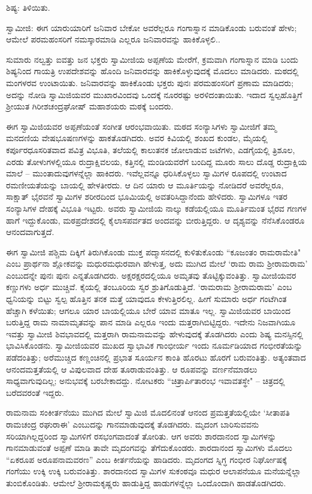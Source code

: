 ಶಿಷ್ಯ: ತಿಳಿಯಿತು.

ಸ್ವಾಮೀಜಿ: ಈಗ ಯಾರುಯಾರಿಗೆ ಜನಿವಾರ ಬೇಕೋ ಅವರೆಲ್ಲರೂ ಗಂಗಾಸ್ನಾನ ಮಾಡಿಕೊಂಡು ಬರುವಂತೆ ಹೇಳು; ಆಮೇಲೆ ಪರಮಹಂಸರಿಗೆ ನಮಸ್ಕಾರಮಾಡಿ ಎಲ್ಲರೂ ಜನಿವಾರವನ್ನು ಹಾಕಿಕೊಳ್ಳಲಿ..

ಸುಮಾರು ನಲ್ವತ್ತು ಐವತ್ತು ಜನ ಭಕ್ತರು ಸ್ವಾಮೀಜಿಯ ಅಪ್ಪಣೆಯ ಮೇರೆಗೆ, ಕ್ರಮವಾಗಿ ಗಂಗಾಸ್ನಾನ ಮಾಡಿ ಬಂದು ಶಿಷ್ಯನಿಂದ ಗಾಯತ್ರಿ ಉಪದೇಶವನ್ನು ಹೊಂದಿ ಜನಿವಾರವನ್ನು ಹಾಕಿಕೊಳ್ಳುವುದಕ್ಕೆ ಮೊದಲು ಮಾಡಿದರು. ಮಠದಲ್ಲಿ ಮಂಗಳರವ ಉಂಟಾಯಿತು. ಜನಿವಾರವನ್ನು ಹಾಕಿಕೊಂಡು ಭಕ್ತರು ಪುನಃ ಪರಮಹಂಸರಿಗೆ ಪ್ರಣಾಮ ಮಾಡಿದರು; ಅದನ್ನು ನೋಡಿ ಸ್ವಾಮಿಜಿಯವರ ಮುಖಾರವಿಂದವು ಒಂದಕ್ಕೆ ನೂರರಷ್ಟು ಅರಳಿದಂತಾಯಿತು. ಇದಾದ ಸ್ವಲ್ಪಹೊತ್ತಿಗೆ ಶ‍್ರೀಯುತ ಗಿರೀಶಚಂದ್ರಘೋಷ್ ಮಹಾಶಯರು ಮಠಕ್ಕೆ ಬಂದರು.

ಈಗ ಸ್ವಾಮಿಜಿಯವರ ಅಪ್ಪಣೆಯಂತೆ ಸಂಗೀತ ಆರಂಭವಾಯಿತು. ಮಠದ ಸಂನ್ಯಾಸಿಗಳು ಸ್ವಾಮೀಜಿಗೆ ತಮ್ಮ ಮನದಣಿಯ ವೇಷಭೂಷಣಗಳನ್ನು ಹಾಕತೊಡಗಿದರು. ಅವರ ಕಿವಿಯಲ್ಲಿ ಶಂಖದ ಕುಂಡಲ, ಮೈಯಲ್ಲಿ ಕರ್ಪೂರಧೂಸರಿತವಾದ ಪವಿತ್ರ ವಿಭೂತಿ, ತಲೆಯಲ್ಲಿ ಕಾಲುತನಕ ಜೋಲಾಡುವ ಜಟೆಗಳು, ಎಡಗೈಯಲ್ಲಿ ತ್ರಿಶೂಲ, ಎರಡು ತೋಳುಗಳಲ್ಲಿಯೂ ರುದ್ರಾಕ್ಷಿವಲಯ, ಕತ್ತಿನಲ್ಲಿ ಮಂಡಿಯವರೆಗೆ ಬಂದಿದ್ದ ಮೂರು ಸಾಲು ದೊಡ್ಡ ರುದ್ರಾಕ್ಷಿಯ ಮಾಲೆ – ಮುಂತಾದುವುಗಳನ್ನೆಲ್ಲಾ ಹಾಕಿದರು. ಇವೆಲ್ಲವನ್ನೂ ಧರಿಸಿಕೊಳ್ಳಲು ಸ್ವಾಮಿಗಳ ರೂಪದಲ್ಲಿ ಉಂಟಾದ ರಮಣೀಯತೆಯನ್ನು ಬಾಯಲ್ಲಿ ಹೇಳತೀರದು. ಆ ದಿನ ಯಾರು ಆ ಮೂರ್ತಿಯನ್ನು ನೋಡಿದರೆ ಅವರೆಲ್ಲರೂ, ಸಾಕ್ಷಾತ್ ಭೈರವನೆ ಸ್ವಾಮಿಗಳ ಶರೀರದಿಂದ ಭೂಮಿಯಲ್ಲಿ ಅವತರಿಸಿದ್ದಾನೆಂದು ಹೇಳಿದರು. ಸ್ವಾಮಿಗಳೂ ಇತರ ಸಂನ್ಯಾಸಿಗಳ ದೇಹಕ್ಕೆ ವಿಭೂತಿ ಇಟ್ಟರು. ಅವರು ಸ್ವಾಮೀಜಿಯ ನಾಲ್ಕು ಕಡೆಯಲ್ಲಿಯೂ ಮೂರ್ತಿಮಂತ ಭೈರವ ಗಣಗಳ ಹಾಗೆ ಇದ್ದುಕೊಂಡು, ಮಠಪ್ರದೇಶದಲ್ಲಿ ಕೈಲಾಸಪರ್ವತದ ಅಂದವನ್ನು ಬೀರುತ್ತಿದ್ದರು. ಆ ದೃಶ್ಯವನ್ನು ನೆನೆಸಿಕೊಂಡರೂ ಆನಂದವಾಗುತ್ತದೆ.

ಈಗ ಸ್ವಾಮೀಜಿ ಪಶ್ಚಿಮ ದಿಕ್ಕಿಗೆ ತಿರುಗಿಕೊಂಡು ಮುಕ್ತ ಪದ್ಮಾಸನದಲ್ಲಿ ಕುಳಿತುಕೊಂಡು “ಕೂಜಂತಂ ರಾಮರಾಮೇತಿ" ಎಂಬ ಪ್ರಾರ್ಥನಾ ಶ್ಲೋಕವನ್ನು ಮಧುರಮಧುರವಾಗಿ ಹೇಳುತ್ತ, ಅದು ಮುಗಿದ ಮೇಲೆ ‘ರಾಮ ರಾಮ ಶ‍್ರೀರಾಮರಾಮ’ ಎಂಬುದನ್ನೇ ಪುನಃ ಪುನಃ ಎನ್ನತೊಡಗಿದರು. ಅಕ್ಷರಕ್ಷರದಲ್ಲಿಯೂ ಅಮೃತವು ತೊಟ್ಟಿಕ್ಕುವಂತಿತ್ತು. ಸ್ವಾಮೀಜಿಯವರ ಕಣ್ಣುಗಳು ಅರ್ಧ ಮುಚ್ಚಿವೆ. ಕೈಯಲ್ಲಿ ತಂಬೂರಿಯ ಸ್ವರ ಶ್ರುತಿಗೊಡುತ್ತಿದೆ. ‘ರಾಮರಾಮ ಶ‍್ರೀರಾಮರಾಮ’ ಎಂಬ ಧ್ವನಿಯನ್ನು ಬಿಟ್ಟು ಸ್ವಲ್ಪ ಹೊತ್ತಿನ ತನಕ ಮತ್ತೆ ಯಾವುದೂ ಕೇಳುತ್ತಿರಲಿಲ್ಲ. ಹೀಗೆ ಸುಮಾರು ಅರ್ಧ ಗಂಟೆಗಿಂತ ಹೆಚ್ಚಾಗಿ ಕಳೆಯಿತು; ಆಗಲೂ ಯಾರ ಬಾಯಲ್ಲಿಯೂ ಬೇರೆ ಯಾವ ಮಾತೂ ಇಲ್ಲ. ಸ್ವಾಮಿಜಿಯವರ ಬಾಯಿಂದ ಬರುತ್ತಿದ್ದ ರಾಮ ನಾಮಾಮೃತವನ್ನು ಪಾನ ಮಾಡಿ ಎಲ್ಲರೂ ಇಂದು ಮತ್ತರಾಗಿಬಿಟ್ಟಿದ್ದರು. ಇದೇನು ನಿಜವಾಗಿಯೂ ಇವತ್ತು ಸ್ವಾಮೀಜಿ ಶಿವಭಾವದಲ್ಲಿ ಮತ್ತರಾಗಿ ರಾಮನಾಮವನ್ನು ಹೇಳುವುದಕ್ಕೆ ತೊಡಗಿದರು ಎಂದು ಶಿಷ್ಯ ಮನಸ್ಸಿನಲ್ಲಿ ಭಾವಿಸಿಕೊಂಡನು. ಸ್ವಾಮೀಜಿಯವರ ಮುಖದ ಸ್ವಾಭಾವಿಕ ಗಾಂಭೀರ್ಯ ಇಂದು ನೂರ್ಮಡಿಯಾದ ಗಂಭೀರತೆಯನ್ನು ಪಡೆದಂತಿತ್ತು; ಅರೆಮುಚ್ಚಿದ ಕಣ್ಣಂಚಿನಲ್ಲಿ ಪ್ರಭಾತ ಸೂರ್ಯನ ಕಾಂತಿ ಹೊರಟು ಹೊರಗೆ ಬರುವಂತಿತ್ತು. ಅತ್ಯಂತವಾದ ಆನಂದಮತ್ತತೆಯಲ್ಲಿ ಆ ವಿಪುಲವಾದ ದೇಹ ತೂರಾಡುವಂತಿತ್ತು. ಆ ರೂಪವನ್ನು ವರ್ಣನೆಮಾಡಲು ಸಾಧ್ಯವಾಗುವುದಿಲ್ಲ; ಅನುಭವಕ್ಕೆ ಬರಬೇಕಾದದ್ದು. ನೋಟಕರು “ಚಿತ್ರಾರ್ಪಿತಾರಂಭ ಇವಾವತಸ್ಥೇ" – ಚಿತ್ರದಲ್ಲಿ ಬರೆದವರಂತೆ ಇದ್ದರು.

ರಾಮನಾಮ ಸಂಕೀರ್ತನೆಯು ಮುಗಿದ ಮೇಲೆ ಸ್ವಾಮಿಜಿ ಮೊದಲಿನಂತೆ ಆನಂದ ಪ್ರಮತ್ತತೆಯಲ್ಲಿಯೇ ‘ಸೀತಾಪತಿ ರಾಮಚಂದ್ರ ರಘುರಾಈ’ ಎಂಬುದನ್ನು ಗಾನಮಾಡುವುದಕ್ಕೆ ತೊಡಗಿದರು. ಮೃದಂಗ ಬಾರಿಸುವವನು ಸರಿಯಾಗಿಲ್ಲದ್ದರಿಂದ ಸ್ವಾಮಿಗಳಿಗೆ ರಸಭಂಗವಾದಂತೆ ತೋರಿತು. ಆಗ ಅವರು ಶಾರದಾನಂದ ಸ್ವಾಮಿಗಳನ್ನು ಗಾನಮಾಡುವಂತೆ ಅಪ್ಪಣೆ ಮಾಡಿ ತಾವೇ ಮೃದಂಗವನ್ನು ತೆಗೆದುಕೊಂಡರು. ಶಾರದಾನಂದ ಸ್ವಾಮಿಗಳು ಮೊದಲು “ಏಕರೂಪ ಅರೂಪನಾಮವರಣ” ಎಂಬ ಕೀರ್ತನೆಯನ್ನು ಹಾಡಿದರು. ಮೃದಂಗದ ಸ್ನಿಗ್ಧ ಗಂಭೀರ ನಿರ್ಘೋಷಕ್ಕೆ ಗಂಗೆಯು ಉಕ್ಕಿ ಉಕ್ಕಿ ಬರುವಂತಿತ್ತು. ಶಾರದಾನಂದ ಸ್ವಾಮಿಗಳ ಸುಕಂಠವೂ ಮಧುರ ಆಲಾಪನೆಯೂ ಮನೆಯನ್ನೆಲ್ಲಾ ತುಂಬಿಕೊಂಡಿತು. ಆಮೇಲೆ ಶ‍್ರೀರಾಮಕೃಷ್ಣರು ಹಾಡುತ್ತಿದ್ದ ಹಾಡುಗಳನ್ನೆಲ್ಲಾ ಒಂದೊಂದಾಗಿ ಹಾಡತೊಡಗಿದರು.

